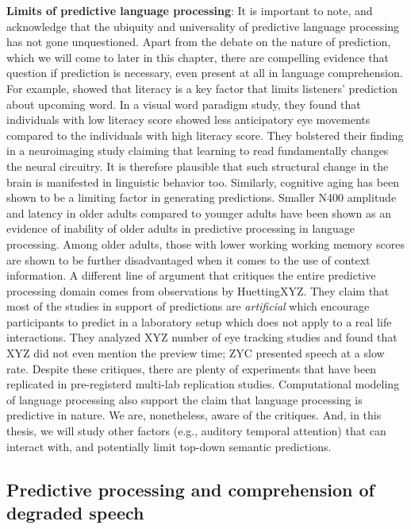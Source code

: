 \documentclass[a4paper, nobind]{templates/ociamthesis}
\begin{document}
\textbf{Limits of predictive language processing}:
It is important to note, and acknowledge that the ubiquity and universality of predictive language processing has not gone unquestioned.
Apart from the debate on the nature of prediction, which we will come to later in this chapter, there are compelling evidence that question if prediction is necessary, even present at all in language comprehension.
For example, \textcite{Mishra2012} showed that literacy is a key factor that limits listeners' prediction about upcoming word.
In a visual word paradigm study, they found that individuals with low literacy score showed less anticipatory eye movements compared to the individuals with high literacy score.
They bolstered their finding in a neuroimaging study claiming that learning to read fundamentally changes the neural circuitry.
It is therefore plausible that such structural change in the brain is manifested in linguistic behavior too.
Similarly, cognitive aging has been shown to be a limiting factor in generating predictions.
Smaller N400 amplitude and latency in older adults compared to younger adults have been shown as an evidence of inability of older adults in predictive processing in language processing.
Among older adults, those with lower working working memory scores are shown to be further disadvantaged when it comes to the use of context information.
A different line of argument that critiques the entire predictive processing domain comes from observations by HuettingXYZ.
They claim that most of the studies in support of predictions are \emph{artificial} which encourage participants to predict in a laboratory setup which does not apply to a real life interactions.
They analyzed XYZ number of eye tracking studies and found that XYZ did not even mention the preview time; ZYC presented speech at a slow rate.
Despite these critiques, there are plenty of experiments that have been replicated in pre-registerd multi-lab replication studies.
Computational modeling of language processing also support the claim that language processing is predictive in nature.
We are, nonetheless, aware of the critiques.
And, in this thesis, we will study other factors (e.g., auditory temporal attention) that can interact with, and potentially limit top-down semantic predictions.

\hypertarget{predictive-processing-and-comprehension-of-degraded-speech}{%
\subsection{Predictive processing and comprehension of degraded speech}\label{predictive-processing-and-comprehension-of-degraded-speech}}
\end{document}

